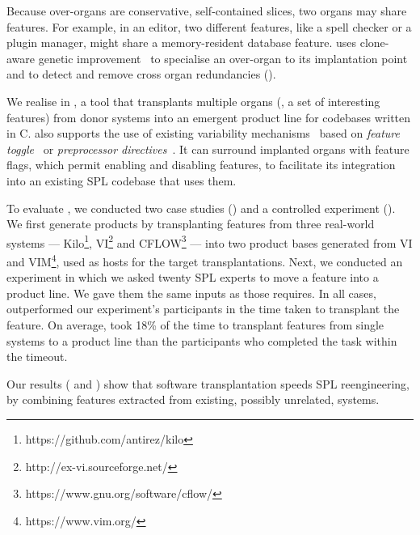 Because over-organs are conservative, self-contained slices, two organs may share features. For example, in an editor, two different features, like a spell checker or a plugin manager, might share a memory-resident database feature. \FOUNDRY uses clone-aware genetic improvement~\cite{Petke18} to specialise an over-organ to its implantation point and to detect and remove cross organ redundancies ().

We realise \FOUNDRY in \prodscalpel, a tool that transplants multiple organs (\ie, a set of interesting features) from donor systems into an emergent product line for codebases written in C.  
\prodscalpel also supports the use of existing variability mechanisms~\cite{Gacek2001} based on \emph{feature toggle}~\cite{Rahman2016} or \emph{preprocessor directives}~\cite{Kastner2008B}. It can surround implanted organs with feature flags, which permit enabling and disabling features, to facilitate its integration into an existing SPL codebase that uses them. 

To evaluate \prodscalpel, we conducted two case studies () and a controlled experiment (). We first generate products by transplanting features from three real-world systems ---  Kilo\footnote{https://github.com/antirez/kilo}, VI\footnote{http://ex-vi.sourceforge.net/} and CFLOW\footnote{https://www.gnu.org/software/cflow/} --- into two product bases generated from VI and VIM\footnote{https://www.vim.org/}, used as hosts for the target transplantations. Next, we conducted an experiment in which we asked twenty SPL experts to move a feature into a product line. 
We gave them the same inputs as those \prodscalpel requires. In all cases, \prodscalpel outperformed our experiment's participants in the time taken to transplant the feature.
On average, \prodscalpel took 18\% of the time to transplant features from single systems to a product line than the participants who completed the task within the timeout.

Our results ( and  ) show that software transplantation speeds SPL reengineering, by combining features extracted from existing, possibly unrelated, systems.

